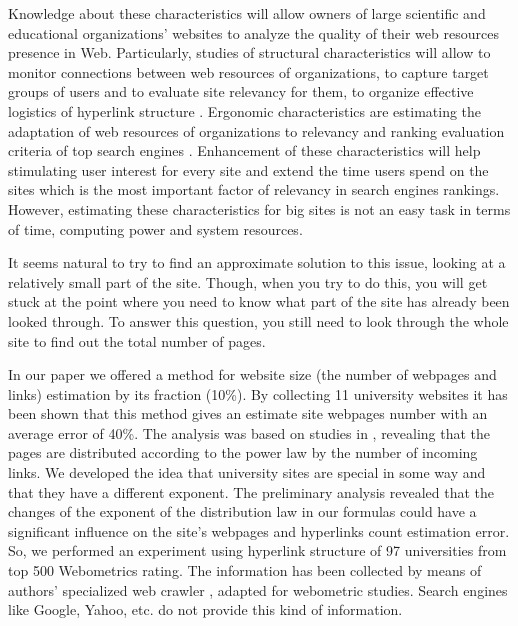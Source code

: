 Knowledge about these characteristics will allow owners of large scientific and educational organizations’ websites to analyze the quality of their web resources presence in Web. Particularly, studies of structural characteristics will allow to monitor connections between web resources of organizations, to capture target groups of users and to evaluate site relevancy for them, to organize effective logistics of hyperlink structure \cite{StuartThelwallHarries,Thelwall,PechnikovNwohiri,PechnikovNwohiri2}. Ergonomic characteristics are estimating the adaptation of web resources of organizations to relevancy and ranking evaluation criteria of top search engines \cite{Huang,BodrunovaYakuninSmolin,LangvilleMeyer}. Enhancement of these characteristics will help stimulating user interest for every site and extend the time users spend on the sites which is the most important factor of relevancy in search engines rankings. However, estimating these characteristics for big sites is not an easy task in terms of time, computing power and system resources.

It seems natural to try to find an approximate solution to this issue, looking at a relatively small part of the site. Though, when you try to do this, you will get stuck at the point where you need to know what part of the site has already been looked through. To answer this question, you still need to look through the whole site to find out the total number of pages.

In our paper \cite{SergeevBlekanovMaksimov} we offered a method for website size (the number of webpages and links) estimation by its fraction (10\%). By collecting 11 university websites it has been shown that this method gives an estimate site webpages number with an average error of 40\%. The analysis was based on studies in \cite{BarabasiAlbert,BroderKumarMaghoul}, revealing that the pages are distributed according to the power law by the number of incoming links. We developed the idea that university sites are special in some way and that they have a different exponent. The preliminary analysis revealed that the changes of the exponent of the distribution law in our formulas \cite{SergeevBlekanovMaksimov} could have a significant influence on the site’s webpages and hyperlinks count estimation error. So, we performed an experiment using hyperlink structure of 97 universities from top 500 Webometrics  \cite{RankingWeb} rating. The information has been collected by means of authors' specialized web crawler \cite{BlekanovSergeevMartynenko}, adapted for webometric studies. Search engines like Google, Yahoo, etc. do not provide this kind of information.

